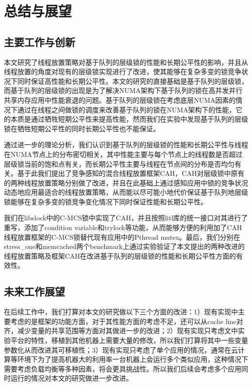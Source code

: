\chapter{总结与展望}
\label{chap:summary}
\section{主要工作与创新}
本文研究了线程放置策略对基于队列的层级锁的性能和长期公平性的影响，并且从线程放置的角度对现有的层级锁实现进行了改进，使其能够在复杂多变的锁竞争状况下同时保证高性能和长期公平性。本文的研究的直接基础是基于队列的层级锁，而基于队列的层级锁的出现是为了解决NUMA架构下基于队列的锁在高并发并行共享内存应用中性能衰退的问题。基于队列的层级锁在考虑底层NUMA因素的情况下通过在线程之间做锁的调度来改善基于队列的锁在NUMA架构下的性能，它的本质是通过牺牲短期公平性来提高性能，然而我们在实验中发现基于队列的层级锁在牺牲短期公平性的同时长期公平性也不能保证。

通过进一步的理论分析，我们认识到基于队列的层级锁的性能和长期公平性与线程在NUMA节点上的分布密切相关，其中性能主要与每个节点上的线程数是否超过层级锁当前的饱和点有关，而长期公平性主要与线程在节点间的分布是否均匀有关。基于此我们提出了竞争感知的混合线程放置框架CAH，CAH对层级锁中原有的两种线程放置策略分别做了改进，并且在此基础上通过感知应用中锁的竞争状况动态地应用最适合的线程放置策略，从而能以尽可能小地代价保证基于队列地层级锁能够在复杂多变的锁竞争变化情况下同时保证性能和长期公平性。

我们在libslock中的C-MCS锁中实现了CAH，并且按照litl库的统一接口对其进行了重写，添加了condition variable和trylock等功能，从而能够方便的利用加了CAH线程放置框架的C-MCS锁替代现有应用中的Pthread mutex。最后，我们分别在stress\_one和memcached两个benchmark上通过实验验证了本文提出的两种改进的线程放置策略及框架CAH在改进基于队列的层级锁的性能和长期公平性方面的有效性。

\section{未来工作展望}
在后续工作中，我们打算对本文的研究做以下三个方面的改进：1）现有实现中主要考虑的是框架的功能方面，对于其性能方面的考虑不足，还可以从cache line对齐，减少变量的共享范围等方面对其做进一步的改进；2）现有实现只考虑文中实验平台的特性，移植到其他机器上需要大量的修改，所以我们打算将其中一些变量参数化从而改进其可移植性；3）现有实现只考虑了单个应用的情况，通常在云计算等环境下为了提高机器大的利用率一台机器上会运行多个类似应用，这种情况下需要考虑负载均衡等多种因素，将会更具挑战性。所以我们后续会考虑多个应用同时运行的情况对本文的研究做进一步改进。